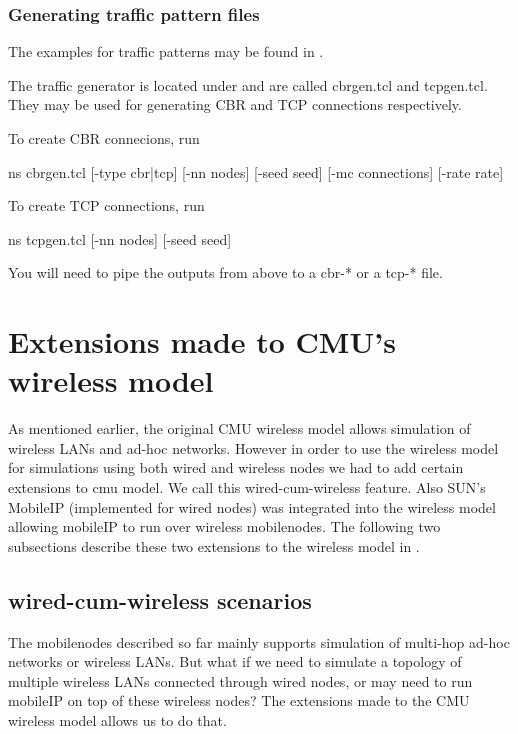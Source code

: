 \subsubsection{Generating traffic pattern files}
\label{sec:mobile-traffic-file}

The examples for traffic patterns may be found in
.

The traffic generator is located under 
and are called cbrgen.tcl and tcpgen.tcl. They may be used for
generating CBR and TCP connections respectively.

To create CBR connecions, run
\begin{program}
ns cbrgen.tcl [-type cbr|tcp] [-nn nodes] [-seed seed] 
              [-mc connections] [-rate rate]
\end{program}
To create TCP connections, run
\begin{program}
ns tcpgen.tcl [-nn nodes] [-seed seed]
\end{program}
You will need to pipe the outputs from above to a cbr-* or a tcp-* file.


\section{Extensions made to CMU's wireless model}
\label{sec:wireless-extensions}

As mentioned earlier, the original CMU wireless model allows
simulation of wireless LANs and ad-hoc networks. However in order to
use the wireless model for simulations using both wired and wireless
nodes we had to add certain extensions to cmu model. We 
call this wired-cum-wireless feature. Also SUN's MobileIP (implemented
for wired nodes) was integrated into the wireless model allowing
mobileIP to run over wireless mobilenodes. The following two
subsections describe these two extensions to the wireless 
model in \ns. 


\subsection{wired-cum-wireless scenarios}
\label{sec:wired-cum-wireless}

The mobilenodes described so far mainly supports simulation of
multi-hop ad-hoc networks or wireless LANs. But what if we need to
simulate a topology of multiple wireless LANs connected through wired
nodes, or may need to run mobileIP on top of these wireless nodes? The
extensions made to the CMU wireless model allows us to do that. 

